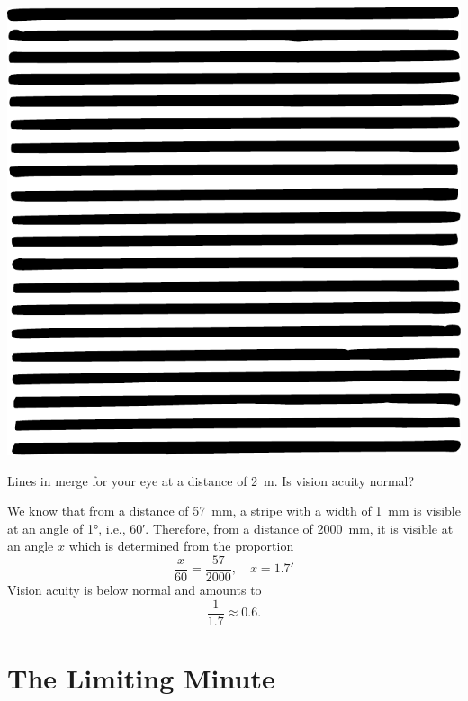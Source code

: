 \begin{marginfigure}%
\centering
\includegraphics[width=\textwidth]{figures/ch-03/fig-073.pdf}
\end{marginfigure}



\ques Lines in  merge for your eye at a distance of \SI{2}{\meter}. Is vision acuity normal? 

\ans We know that from a distance of \SI{57}{\milli\meter}, a stripe with a width of \SI{1}{\milli\meter} is visible at an angle of \ang{1}, i.e., \ang{;60}. Therefore, from a distance of \SI{2000}{\milli\meter}, it is visible at an angle $x$ which is determined from the proportion 
\begin{equation*}%
\frac{x}{60} = \frac{57}{2000}, \quad x = \ang{;1.7}
\end{equation*}
Vision acuity is below normal and amounts to
\begin{equation*}%
\frac{1}{1.7} \approx 0.6.
\end{equation*}


\section{The Limiting Minute}
\label{sec-3.12}

